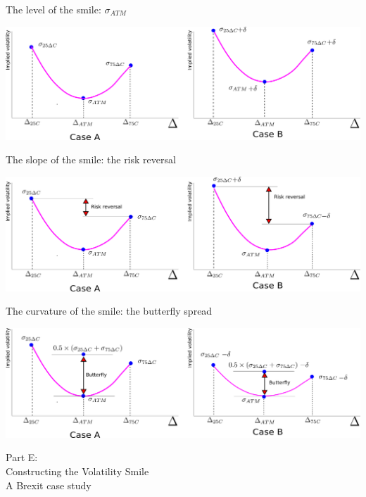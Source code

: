 \begin{frame}{The level of the smile: \(\sigma_{ATM}\)}

\includegraphics[width=1\linewidth]{images/figRRLevel}

\end{frame}

\begin{frame}{The slope of the smile: the risk reversal}

\includegraphics[width=1\linewidth]{images/figRRSlope}

\end{frame}

\begin{frame}{The curvature of the smile: the butterfly spread}

\includegraphics[width=1\linewidth]{images/figRRCurvature}

\end{frame}

\begin{frame}{}

\color{blue} \LARGE{Part E:}\\
\LARGE{Constructing the Volatility Smile}\\
\Large{A Brexit case study}

\end{frame}

